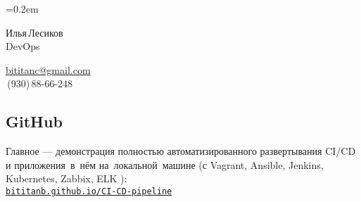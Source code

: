 \documentclass[11pt, a4paper]{article}
\newcommand{\Delimitline}{
  \vspace{-2ex}
  \noindent\makebox[\linewidth]{\rule{\DelimitlineLength}{0.12ex}} }
\newcommand\rurl[1]{%
  \-\hspace{0.5em}
  \href{http://#1}{\nolinkurl{#1}}%
}
\newcommand\Eng[1]{%
  \foreignlanguage{english}{#1}%
}
\newcommand{\forceindent}{\leavevmode{\parindent=1.5em\indent}}
\begin{document}
\sffamily

\font=0.2em

\newlength{\DelimitlineLength}
\setlength{\DelimitlineLength}{\textwidth+1em}

\pagecolor[RGB]{245,245,245}

{\setlength\multicolsep{0pt}%
\begin{multicols}{2}

\begin{spacing}{1.5}
  \rmfamily
  {\LARGE Илья\,Лесиков}\\
  {\Large\Eng{DevOps}}\hspace{1cm}{\large 25\,лет}
\end{spacing}

\columnbreak

\begin{flushright}
  \begin{spacing}{1.5}
    \rmfamily
    {\large\href{mailto:bititanc@gmail.com}{\Eng{bititanc@gmail.com}}}\\
    {\fontsize{1.4em}{0}\,(930)\,88-66-248} \normalsize\\
  \end{spacing}
\end{flushright}

\end{multicols}
}

\vspace{2ex}

\begin{comment}
У меня нет образования (неоконченный колледж электроники) и сомнительный стаж (10 месяцев сисадмином).\\
Но, самообучаясь, за последние пару лет я получил достаточный опыт и в общей автоматизации, и в \Eng{CI/CD}.\\
Получил некоторый опыт и в кодинге, как и хороший общий технический бэкграунд (\Eng{Linux}, сети и т.\,п.).
\end{comment}

\subsection*{GitHub}
\Delimitline

{
\raggedright
\forceindent Главное — демонстрация полностью автоматизированного развертывания \Eng{CI/CD} и приложения~в~нём на~локальной~машине
(с \Eng{Vagrant, Ansible, Jenkins, Kubernetes, Zabbix, ELK}):
\vspace{0.4ex}\\
  \rurl{bititanb.github.io/CI-CD-pipeline}
}
  
\end{document}
